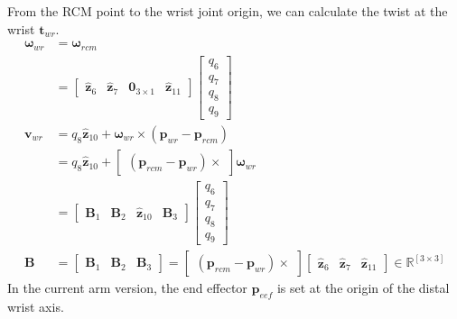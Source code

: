 \documentclass{article}
\begin{document}
From the RCM point to the wrist joint origin, we can calculate the twist at the wrist $\mathbf{t}_{wr}$.
\begin{equation}
\begin{split}
\boldsymbol{\omega}_{wr} &= \boldsymbol{\omega}_{rcm}\\
&=  \begin{bmatrix}\hat{\mathbf{z}}_6 & \hat{\mathbf{z}}_7 & \mathbf{0}_{3\times1} & \hat{\mathbf{z}}_{11} \end{bmatrix} \begin{bmatrix}q_6\\q_7\\q_8\\q_9 \end{bmatrix}\\
\mathbf{v}_{wr} &= q_8 \hat{\mathbf{z}}_{10} + \boldsymbol{\omega}_{wr} \times (\mathbf{p}_{wr} - \mathbf{p}_{rcm})\\
&= q_8 \hat{\mathbf{z}}_{10} + \begin{bmatrix}(\mathbf{p}_{rcm} - \mathbf{p}_{wr})\times \end{bmatrix} \boldsymbol{\omega}_{wr}\\
& = \begin{bmatrix}\mathbf{B}_1 & \mathbf{B}_2 & \hat{\mathbf{z}}_{10} & \mathbf{B}_3 \end{bmatrix} \begin{bmatrix}q_6\\q_7\\q_8\\q_9 \end{bmatrix}\\
\mathbf{B} &= \begin{bmatrix}\mathbf{B}_1 & \mathbf{B}_2 & \mathbf{B}_3 \end{bmatrix} =  \begin{bmatrix}(\mathbf{p}_{rcm} - \mathbf{p}_{wr})\times \end{bmatrix} \begin{bmatrix}\hat{\mathbf{z}}_6 & \hat{\mathbf{z}}_7 & \hat{\mathbf{z}}_{11} \end{bmatrix}\in \mathbb{R}^{[3\times3]}
\end{split}
\end{equation}
In the current arm version, the end effector $\mathbf{p}_{eef}$ is set at the origin of the distal wrist axis.
\end{document}
